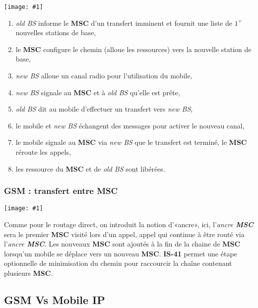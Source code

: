 \documentclass{article}
\newcommand{\imgR}[2]{\begin{center}\texttt{[image: \#1]}\end{center}}
\begin{document}
\begin{multicols}{2}
\imgR{CN_170.png}{250}
\begin{enumerate}
\item \textit{old BS} informe le \textbf{MSC} d'un transfert imminent et fournit une liste de $1^+$ nouvelles 
stations de base,
\item le \textbf{MSC} configure le chemin (alloue les ressources) vers la nouvelle station de base,
\item \textit{new BS} alloue un canal radio pour l'utilisation du mobile,
\item \textit{new BS} signale au \textbf{MSC} et à \textit{old BS} qu'elle est prête,
\item \textit{old BS} dit au mobile d'effectuer un transfert vers \textit{new BS},
\item le mobile et \textit{new BS} échangent des messages pour activer le nouveau canal,
\item le mobile signale au \textbf{MSC} via \textit{new BS} que le transfert est terminé, le \textbf{MSC} réroute 
les appels,
\item les ressource du \textbf{MSC} et de \textit{old BS} sont libérées.
\end{enumerate}
\end{multicols}

\subsubsection{GSM : transfert entre MSC}

\begin{multicols}{2}
\imgR{CN_171.png}{220}
Comme pour le routage direct, on introduit la notion d'«ancre», ici, l'\textit{ancre \textbf{MSC}} sera le 
premier \textbf{MSC} visité lors d'un appel, appel qui continue à être routé via l'\textit{ancre \textbf{MSC}}. 
Les nouveaux \textbf{MSC} sont ajoutés à la fin de la chaine de \textbf{MSC} lorsqu'un mobile se déplace vers un 
nouveau \textbf{MSC}. \textbf{IS-41} permet une étape optionnelle de minimisation du chemin pour raccourcir la 
chaîne contenant plusieurs \textbf{MSC}.
\end{multicols}

\subsection{GSM Vs Mobile IP}
\end{document}
